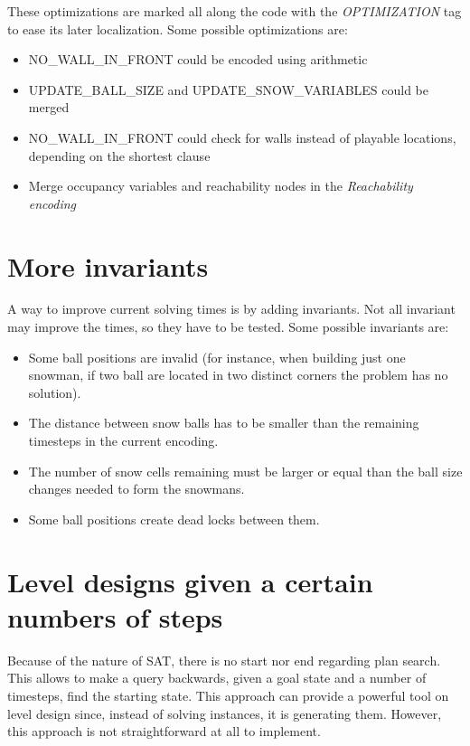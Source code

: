 \documentclass{report}
\theoremstyle{plain}
\begin{document}
These optimizations are marked all along the code with the \emph{OPTIMIZATION} tag to ease its later localization. Some possible optimizations are:
\begin{itemize}
    \item NO\_WALL\_IN\_FRONT could be encoded using arithmetic
    \item UPDATE\_BALL\_SIZE and UPDATE\_SNOW\_VARIABLES could be merged
    \item NO\_WALL\_IN\_FRONT could check for walls instead of playable locations, depending on the shortest clause
    \item Merge occupancy variables and reachability nodes in the \emph{Reachability encoding}
\end{itemize}

\section{More invariants}
A way to improve current solving times is by adding invariants. Not all invariant may improve the times, so they have to be tested. Some possible invariants are:
\begin{itemize}
    \item Some ball positions are invalid (for instance, when building just one snowman, if two ball are located in two distinct corners the problem has no solution).
    \item The distance between snow balls has to be smaller than the remaining timesteps in the current encoding.
    \item The number of snow cells remaining must be larger or equal than the ball size changes needed to form the snowmans.
    \item Some ball positions create dead locks between them.
\end{itemize}

\section{Level designs given a certain numbers of steps}
Because of the nature of SAT, there is no start nor end regarding plan search. This allows to make a query backwards, given a goal state and a number of timesteps, find the starting state. This approach can provide a powerful tool on level design since, instead of solving instances, it is generating them.
However, this approach is not straightforward at all to implement.
\end{document}

